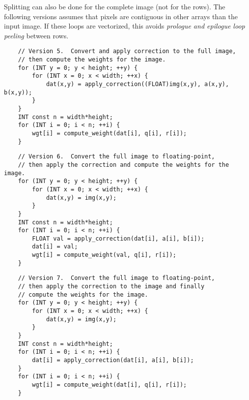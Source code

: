 \documentclass[10pt]{article}
\begin{document}
Splitting can also be done for the complete image (not for the rows).
The following versions assumes that pixels are contiguous in other
arrays than the input image.  If these loops are vectorized, this
avoids \emph{prologue and epilogue loop peeling} between rows.

\begin{verbatim}
    // Version 5.  Convert and apply correction to the full image,
    // then compute the weights for the image.
    for (INT y = 0; y < height; ++y) {
        for (INT x = 0; x < width; ++x) {
            dat(x,y) = apply_correction((FLOAT)img(x,y), a(x,y), b(x,y));
        }
    }
    INT const n = width*height;
    for (INT i = 0; i < n; ++i) {
        wgt[i] = compute_weight(dat[i], q[i], r[i]);
    }
\end{verbatim}

\begin{verbatim}
    // Version 6.  Convert the full image to floating-point,
    // then apply the correction and compute the weights for the image.
    for (INT y = 0; y < height; ++y) {
        for (INT x = 0; x < width; ++x) {
            dat(x,y) = img(x,y);
        }
    }
    INT const n = width*height;
    for (INT i = 0; i < n; ++i) {
        FLOAT val = apply_correction(dat[i], a[i], b[i]);
        dat[i] = val;
        wgt[i] = compute_weight(val, q[i], r[i]);
    }
\end{verbatim}

\begin{verbatim}
    // Version 7.  Convert the full image to floating-point,
    // then apply the correction to the image and finally
    // compute the weights for the image.
    for (INT y = 0; y < height; ++y) {
        for (INT x = 0; x < width; ++x) {
            dat(x,y) = img(x,y);
        }
    }
    INT const n = width*height;
    for (INT i = 0; i < n; ++i) {
        dat[i] = apply_correction(dat[i], a[i], b[i]);
    }
    for (INT i = 0; i < n; ++i) {
        wgt[i] = compute_weight(dat[i], q[i], r[i]);
    }
\end{verbatim}
\end{document}
